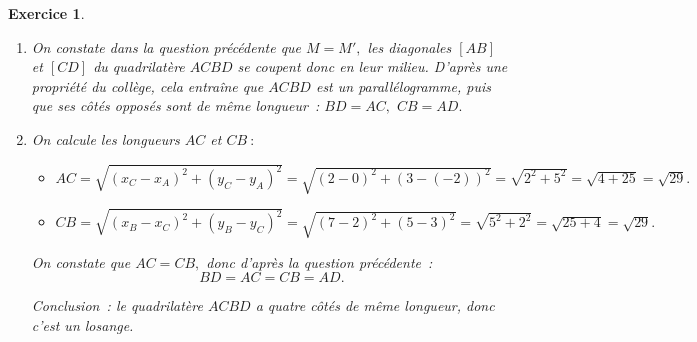 \documentclass[10pt]{article}
\newtheorem{exo}{Exercice}
\begin{document}
\begin{exo}
\begin{enumerate}
\[M'\left(\frac{x_C+x_D}{2};\frac{y_C+y_D}{2}\right)\qquad M'\left(\frac{2+5}{2};\frac{3+0}{2}\right)\qquad M'\left(\frac{7}{2};\frac{3}{2}\right)\qquad M'\left(3,5;1,5\right).\]
\item On constate dans la question précédente que $M=M',$ les diagonales $\left[AB\right]$ et $\left[CD\right]$ du quadrilatère $ACBD$ se coupent donc en leur milieu. D'après une propriété du collège, cela entraîne que $ACBD$ est un parallélogramme, puis que ses côtés opposés sont de même longueur~: $BD=AC,$ $CB=AD.$
\item On calcule les longueurs $AC$ et $CB~:$

\begin{itemize}
\item[\textbullet] $AC=\sqrt{\left(x_C-x_A\right)^2+\left(y_C-y_A\right)^2}=\sqrt{\left(2-0\right)^2+\left(3-(-2)\right)^2}=\sqrt{2^2+5^2}=\sqrt{4+25}=\sqrt{29}.$
\item[\textbullet] $CB=\sqrt{\left(x_B-x_C\right)^2+\left(y_B-y_C\right)^2}=\sqrt{\left(7-2\right)^2+\left(5-3\right)^2}=\sqrt{5^2+2^2}=\sqrt{25+4}=\sqrt{29}.$
\end{itemize}

On constate que $AC=CB,$ donc d'après la question précédente~:
\[BD=AC=CB=AD.\]

Conclusion~: le quadrilatère $ACBD$ a quatre côtés de même longueur, donc c'est un losange.

\end{enumerate}

\end{exo}
\end{document}
